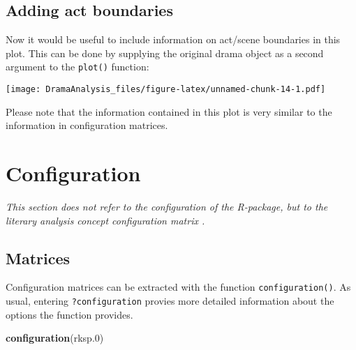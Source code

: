 \documentclass[]{book}
\newenvironment{Shaded}{\begin{snugshade}}{\end{snugshade}}
\newcommand{\CommentTok}[1]{\textcolor[rgb]{0.56,0.35,0.01}{\textit{#1}}}
\newcommand{\DataTypeTok}[1]{\textcolor[rgb]{0.13,0.29,0.53}{#1}}
\newcommand{\DecValTok}[1]{\textcolor[rgb]{0.00,0.00,0.81}{#1}}
\newcommand{\FloatTok}[1]{\textcolor[rgb]{0.00,0.00,0.81}{#1}}
\newcommand{\KeywordTok}[1]{\textcolor[rgb]{0.13,0.29,0.53}{\textbf{#1}}}
\newcommand{\NormalTok}[1]{#1}
\newcommand{\OperatorTok}[1]{\textcolor[rgb]{0.81,0.36,0.00}{\textbf{#1}}}
\newcommand{\StringTok}[1]{\textcolor[rgb]{0.31,0.60,0.02}{#1}}
\begin{document}
\hypertarget{adding-act-boundaries}{%
\section{Adding act boundaries}\label{adding-act-boundaries}}

Now it would be useful to include information on act/scene boundaries in this plot. This can be done by supplying the original drama object as a second argument to the \texttt{plot()} function:

\begin{Shaded}
\end{Shaded}

\texttt{[image: DramaAnalysis\_files/figure-latex/unnamed-chunk-14-1.pdf]}

Please note that the information contained in this plot is very similar to the information in configuration matrices.

\hypertarget{configuration}{%
\chapter{Configuration}\label{configuration}}

\emph{This section does not refer to the configuration of the R-package, but to the literary analysis concept configuration matrix \citep{Pfister:1988aa}.}

\hypertarget{matrices}{%
\section{Matrices}\label{matrices}}

Configuration matrices can be extracted with the function \texttt{configuration()}. As usual, entering \texttt{?configuration} provies more detailed information about the options the function provides.

\begin{Shaded}
\begin{Highlighting}[]
\KeywordTok{configuration}\NormalTok{(rksp}\FloatTok{.0}\NormalTok{)}
\end{Highlighting}
\end{Shaded}
\end{document}

